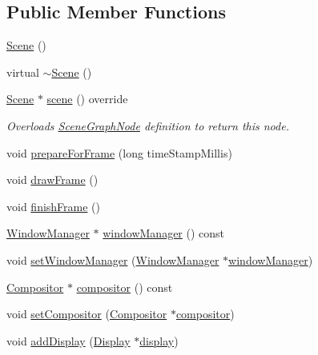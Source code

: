 \subsection*{Public Member Functions}
\begin{DoxyCompactItemize}
\item 
\hyperlink{classmotorcar_1_1Scene_ad10176d75a9cc0da56626f682d083507}{Scene} ()
\item 
virtual \hyperlink{classmotorcar_1_1Scene_a3b8cec2e32546713915f8c6303c951f1}{$\sim$\-Scene} ()
\item 
\hyperlink{classmotorcar_1_1Scene}{Scene} $\ast$ \hyperlink{classmotorcar_1_1Scene_a6e665c0d1e6b838073c61166a77c8477}{scene} () override
\begin{DoxyCompactList}\small\item\em Overloads \hyperlink{classmotorcar_1_1SceneGraphNode}{Scene\-Graph\-Node} definition to return this node. \end{DoxyCompactList}\item 
void \hyperlink{classmotorcar_1_1Scene_a56d26423475317e64a4c7cfdec193213}{prepare\-For\-Frame} (long time\-Stamp\-Millis)
\item 
void \hyperlink{classmotorcar_1_1Scene_a428e4369e27ac0224dd8937594aadcd2}{draw\-Frame} ()
\item 
void \hyperlink{classmotorcar_1_1Scene_a5158b1eae76b1a4e6c77a7a6b41d43d9}{finish\-Frame} ()
\item 
\hyperlink{classmotorcar_1_1WindowManager}{Window\-Manager} $\ast$ \hyperlink{classmotorcar_1_1Scene_a8981438767571989fb2b934e53f266f8}{window\-Manager} () const 
\item 
void \hyperlink{classmotorcar_1_1Scene_afacdf1d66cd18832e841b45bec34964b}{set\-Window\-Manager} (\hyperlink{classmotorcar_1_1WindowManager}{Window\-Manager} $\ast$\hyperlink{classmotorcar_1_1Scene_a8981438767571989fb2b934e53f266f8}{window\-Manager})
\item 
\hyperlink{classmotorcar_1_1Compositor}{Compositor} $\ast$ \hyperlink{classmotorcar_1_1Scene_aac8e8cdfc6a46fb4a8c3e1c192e074f1}{compositor} () const 
\item 
void \hyperlink{classmotorcar_1_1Scene_abeab0365e3e8ea1857b41a32e09323f8}{set\-Compositor} (\hyperlink{classmotorcar_1_1Compositor}{Compositor} $\ast$\hyperlink{classmotorcar_1_1Scene_aac8e8cdfc6a46fb4a8c3e1c192e074f1}{compositor})
\item 
void \hyperlink{classmotorcar_1_1Scene_a3482161400b2f552307cc70812b128a9}{add\-Display} (\hyperlink{classmotorcar_1_1Display}{Display} $\ast$\hyperlink{structdisplay}{display})

\end{DoxyCompactItemize}
